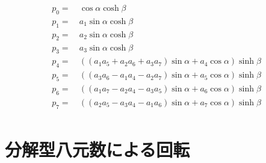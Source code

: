 \documentclass[a4paper,12pt,notitlepage]{jsreport}
\begin{document}
\begin{equation}
\begin{split}
p_0=~&\cos\alpha\cosh\beta\\
p_1=~&a_1\sin\alpha\cosh\beta\\
p_2=~&a_2\sin\alpha\cosh\beta\\
p_3=~&a_3\sin\alpha\cosh\beta\\
p_4=~&((a_1a_5+a_2a_6+a_3a_7)\sin\alpha+a_4\cos\alpha)\sinh\beta\\
p_5=~&((a_3a_6-a_1a_4-a_2a_7)\sin\alpha+a_5\cos\alpha)\sinh\beta\\
p_6=~&((a_1a_7-a_2a_4-a_3a_5)\sin\alpha+a_6\cos\alpha)\sinh\beta\\
p_7=~&((a_2a_5-a_3a_4-a_1a_6)\sin\alpha+a_7\cos\alpha)\sinh\beta\\
\end{split}
\end{equation}

\section{分解型八元数による回転}
\end{document}
